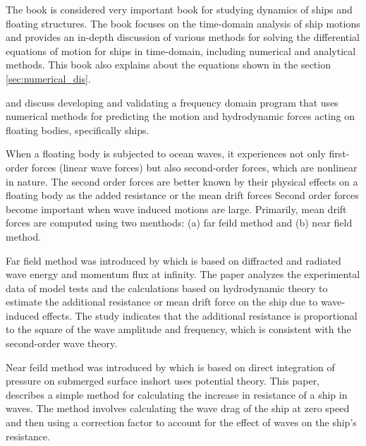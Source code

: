 The book \cite{liapis1986time} is considered very important book for studying dynamics of ships and
floating structures. The book focuses on the time-domain analysis of ship motions and provides 
an in-depth discussion of various methods for solving the differential equations of motion 
for ships in time-domain, including numerical and analytical methods. This book also explains about the
equations shown in the section \ref{sec:numerical_dis}.

\cite{guha2013development} and \cite{guha2015estimation} discuss developing and validating a 
frequency domain program that uses numerical methods for predicting the motion and hydrodynamic 
forces acting on floating bodies, specifically ships.

When a floating body is subjected to ocean waves, it experiences not only first-order forces 
(linear wave forces) but also second-order forces, which are nonlinear in nature. 
The second order forces are better known by their physical effects on a floating
body as the added resistance or the mean drift forces
Second order forces become important when wave induced motions are large. 
Primarily, mean drift forces are computed using two menthods:
(a) far feild method and (b) near field method. 

Far field method was introduced by \cite{maruo1957excess} which is based on diffracted and radiated
wave energy and momentum flux at infinity.
The paper analyzes the experimental 
data of model tests and the calculations based on hydrodynamic theory to estimate the additional 
resistance or mean drift force on the ship due to wave-induced effects. The study indicates that the additional 
resistance is proportional to the square of the wave amplitude and frequency, which is 
consistent with the second-order wave theory.

Near feild method was introduced by \cite{boese1970einfache} which is based on direct integration of 
pressure on submerged surface inshort uses potential theory.
This paper, describes a simple method for calculating the increase in resistance of a ship in waves. 
The method involves calculating the wave drag of the ship at zero speed and then using a 
correction factor to account for the effect of waves on the ship's resistance.

